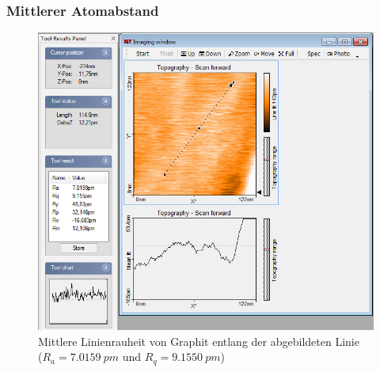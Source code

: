 \subsubsection{Mittlerer Atomabstand}
\begin{figure}[H]
\centering
\includegraphics[scale = 0.75]{snipping_122_linienrauheit}
\caption{ Mittlere Linienrauheit von Graphit entlang der abgebildeten Linie \\ ($R_a = \SI{7,0159}{pm}$ und $R_q = \SI{9,1550}{pm}$) }
\label{fig:mittlere_Atomabstand}
\end{figure}